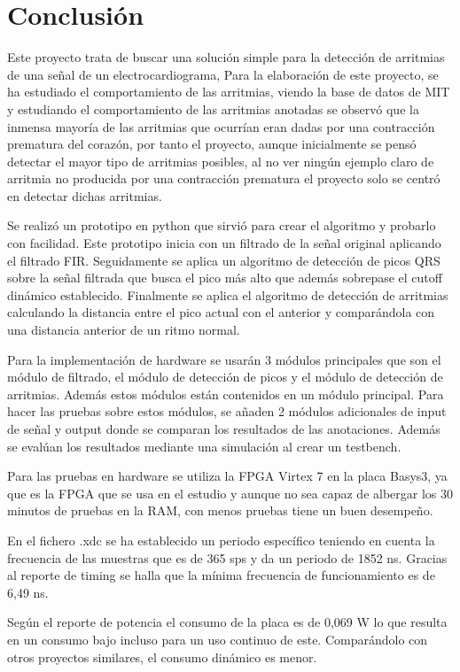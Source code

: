 \chapter*{Conclusión}
Este proyecto trata de buscar una solución simple para la detección de 
arritmias de una señal de un electrocardiograma, Para la elaboración de este proyecto, 
se ha estudiado el comportamiento de las arritmias, viendo la base de datos de MIT y estudiando
el comportamiento de las arritmias anotadas se observó que la inmensa mayoría de las arritmias 
que ocurrían eran dadas por una contracción prematura del corazón, por tanto el proyecto, aunque
inicialmente se pensó detectar el mayor tipo de arritmias posibles, al no ver ningún ejemplo claro
de arritmia no producida por una contracción prematura el proyecto solo se centró en detectar dichas arritmias.

Se realizó un prototipo en python que sirvió para crear el algoritmo y probarlo con facilidad. Este prototipo inicia
con un filtrado de la señal original aplicando el filtrado FIR. Seguidamente se aplica un algoritmo de detección de 
picos QRS sobre la señal filtrada que busca el pico más alto que además sobrepase el cutoff dinámico establecido. Finalmente
se aplica el algoritmo de detección de arritmias calculando la distancia entre el pico actual con el anterior y comparándola con una
distancia anterior de un ritmo normal.

Para la implementación de hardware se usarán 3 módulos principales que son el módulo de filtrado, el módulo de detección de picos 
y el módulo de detección de arritmias. Además estos módulos están contenidos en un módulo principal. Para hacer las pruebas sobre
estos módulos, se añaden 2 módulos adicionales de input de señal y output donde se comparan los resultados de las anotaciones. Además 
se evalúan los resultados mediante una simulación al crear un testbench.

Para las pruebas en hardware se utiliza la FPGA Virtex 7 en la placa Basys3, ya que es la FPGA que se usa en el estudio y aunque no sea capaz de 
albergar los 30 minutos de pruebas en la RAM, con menos pruebas tiene un buen desempeño.

En el fichero .xdc se ha establecido un periodo específico teniendo en cuenta la frecuencia de las muestras que es de 365 sps y da un periodo 
de 1852 ns. Gracias al reporte de timing se halla que la mínima frecuencia de funcionamiento es de 6,49 ns.

Según el reporte de potencia el consumo de la placa es de 0,069 W lo que resulta en un consumo bajo incluso para un uso continuo de este.
Comparándolo con otros proyectos similares, el consumo dinámico es menor.

